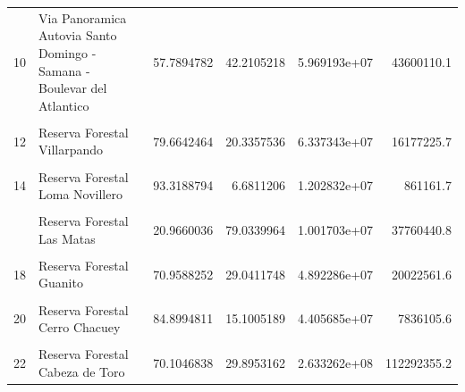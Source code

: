 \documentclass[10pt,landscape,a3paper]{article}
\begin{document}
\begin{longtable}[t]{llrrrr}
10 & Via Panoramica Autovia Santo Domingo - Samana - Boulevar del Atlantico & 57.7894782 & 42.2105218 & 5.969193e+07 & 43600110.1\\
\addlinespace
\cellcolor{lightgray}{11} & \cellcolor{lightgray}{Santuario De Mamiferos Marinos Estero Hondo} & \cellcolor{lightgray}{31.2148392} & \cellcolor{lightgray}{68.7851608} & \cellcolor{lightgray}{1.015811e+07} & \cellcolor{lightgray}{22384455.7}\\
12 & Reserva Forestal Villarpando & 79.6642464 & 20.3357536 & 6.337343e+07 & 16177225.7\\
\cellcolor{lightgray}{13} & \cellcolor{lightgray}{Reserva Forestal Río Cana} & \cellcolor{lightgray}{80.1427532} & \cellcolor{lightgray}{19.8572468} & \cellcolor{lightgray}{2.083290e+08} & \cellcolor{lightgray}{51618405.8}\\
14 & Reserva Forestal Loma Novillero & 93.3188794 & 6.6811206 & 1.202832e+07 & 861161.7\\
\cellcolor{lightgray}{15} & \cellcolor{lightgray}{Reserva Forestal Loma El 20} & \cellcolor{lightgray}{69.5133433} & \cellcolor{lightgray}{30.4866567} & \cellcolor{lightgray}{3.476835e+07} & \cellcolor{lightgray}{15248448.2}\\
\addlinespace
16 & Reserva Forestal Las Matas & 20.9660036 & 79.0339964 & 1.001703e+07 & 37760440.8\\
\cellcolor{lightgray}{17} & \cellcolor{lightgray}{Reserva Forestal Hatillo} & \cellcolor{lightgray}{63.6135031} & \cellcolor{lightgray}{36.3864969} & \cellcolor{lightgray}{2.030413e+08} & \cellcolor{lightgray}{116138281.8}\\
18 & Reserva Forestal Guanito & 70.9588252 & 29.0411748 & 4.892286e+07 & 20022561.6\\
\cellcolor{lightgray}{19} & \cellcolor{lightgray}{Reserva Forestal Cerro de Bocanigua} & \cellcolor{lightgray}{8.6179107} & \cellcolor{lightgray}{91.3820893} & \cellcolor{lightgray}{2.517152e+06} & \cellcolor{lightgray}{26691226.5}\\
20 & Reserva Forestal Cerro Chacuey & 84.8994811 & 15.1005189 & 4.405685e+07 & 7836105.6\\
\addlinespace
\cellcolor{lightgray}{21} & \cellcolor{lightgray}{Reserva Forestal Cayuco} & \cellcolor{lightgray}{88.0875912} & \cellcolor{lightgray}{11.9124088} & \cellcolor{lightgray}{4.438683e+06} & \cellcolor{lightgray}{600259.4}\\
22 & Reserva Forestal Cabeza de Toro & 70.1046838 & 29.8953162 & 2.633262e+08 & 112292355.2\\

\end{longtable}
\end{document}

